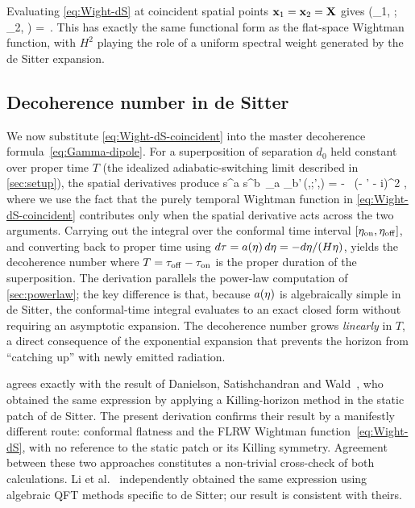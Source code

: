 Evaluating \cref{eq:Wight-dS} at coincident spatial points $\mathbf{x}_1 = \mathbf{x}_2 = \mathbf{X}$
gives
%
\be
  \Wight(\eta_1, ;\, \eta_2, )
  =
   \,.
  \label{eq:Wight-dS-coincident}
\ee
%
This has exactly the same functional form as the flat-space Wightman function,
with $H^2$ playing the role of a uniform spectral weight generated by the de
Sitter expansion.

\subsection{Decoherence number in de Sitter}
\label{sec:desitter-result}

We now substitute \cref{eq:Wight-dS-coincident} into the master decoherence
formula~\eqref{eq:Gamma-dipole}.  For a superposition of separation $d_0$ held
constant over proper time $T$ (the idealized adiabatic-switching limit described
in \cref{sec:setup}), the spatial derivatives produce
%
\be
  s^a s^b \,\partial_a \partial_{b'}\,\Wight(\eta,;\eta',)
  =
  -
  \cdot
  \,
       {(\eta - \eta' - i\varepsilon)^2} ,
  \label{eq:dS-derivative}
\ee
%
where we use the fact that the purely temporal Wightman function in
\cref{eq:Wight-dS-coincident} contributes only when the spatial derivative
acts across the two arguments.  Carrying out the integral over the conformal
time interval $[\eta_{\rm on}, \eta_{\rm off}]$, and converting back to proper
time using $d\tau = a(\eta)\,d\eta = -d\eta/(H\eta)$, yields the
decoherence number
%
\be
  \label{eq:N-dS}
\ee
%
where $T = \tau_{\rm off} - \tau_{\rm on}$ is the proper duration of the
superposition.  The derivation parallels the power-law computation of
\cref{sec:powerlaw}; the key difference is that, because $a(\eta)$ is
algebraically simple in de Sitter, the conformal-time integral evaluates to
an exact closed form without requiring an asymptotic expansion.  The decoherence
number grows \emph{linearly} in $T$, a direct consequence of the exponential
expansion that prevents the horizon from ``catching up'' with newly emitted
radiation.

 agrees exactly with the result of Danielson, Satishchandran
and Wald~\cite{Danielson:2022tdw}, who obtained the same expression by
applying a Killing-horizon method in the static patch of de Sitter.  The
present derivation confirms their result by a manifestly different route:
conformal flatness and the FLRW Wightman function~\eqref{eq:Wight-dS}, with
no reference to the static patch or its Killing symmetry.  Agreement between
these two approaches constitutes a non-trivial cross-check of both
calculations.  Li et al.~\cite{Li:2024} independently obtained the same
expression using algebraic QFT methods specific to de Sitter; our result
is consistent with theirs.

